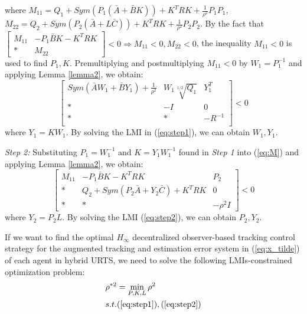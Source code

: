 \documentclass{ieeeaccess}
\begin{document}
where $M_{11}=Q_1+Sym(P_1(\bar{A}+\bar{B}K)) + K^TRK + \frac{1}{\rho^2}P_1P_1$, $M_{22}=Q_2+Sym(P_2(\bar{A}+L\bar{C})) + K^TRK + \frac{1}{\rho^2}P_2P_2$. By the fact that $\begin{bmatrix}
    M_{11} & -P_1\bar{B}K - K^TRK \\ * & M_{22}
\end{bmatrix} < 0 \Rightarrow M_{11}<0, M_{22}<0$, the inequality $M_{11}<0$ is used to find $P_1,K$. Premultiplying and
postmultiplying $M_{11}<0$ by $W_1=P_1^{-1}$ and applying Lemma \ref{lemma2}, we obtain:
\begin{equation} \label{eq:step1}
    \begin{bmatrix}
        Sym(\bar{A}W_1+\bar{B}Y_1) + \frac{1}{\rho^2} & W_1\sqrt[1/2]{Q_1} & Y_1^T \\
        * & -I & 0\\
        * & * & -R^{-1}\\
    \end{bmatrix} < 0
\end{equation}
where $Y_1=KW_1$. By solving the LMI in (\ref{eq:step1}), we can obtain $W_1,Y_1$.

\textit{Step 2:} Substituting $P_1=W_1^{-1}$ and $K=Y_1W_1^{-1}$ found in \textit{Step 1} into (\ref{eq:M}) and applying Lemma \ref{lemma2}, we obtain:
\begin{equation} \label{eq:step2}
    \begin{bmatrix}
        M_{11} & -P_1\bar{B}K - K^TRK & P_2 \\
        * & Q_2+Sym(P_2\bar{A}+Y_2\bar{C}) + K^TRK & 0 \\
        * & * & -\rho^2I
    \end{bmatrix} < 0
\end{equation}
where $Y_2=P_2L$. By solving the LMI (\ref{eq:step2}), we can obtain $P_2,Y_2$.


If we want to find the optimal $H_\infty$ decentralized observer-based tracking control strategy for the augmented tracking and estimation error system in (\ref{eq:x_tilde}) of each agent in hybrid URTS, we need to solve the following LMIs-constrained optimization problem:
\begin{equation} \label{LMI constraint}
    \begin{split}
        & \rho^{*2}=\mathop{\min}_{P,K,L} \rho^2 \\
        & s.t. (\refeq{eq:step1}),(\refeq{eq:step2}) 
    \end{split}
\end{equation}
\end{document}
